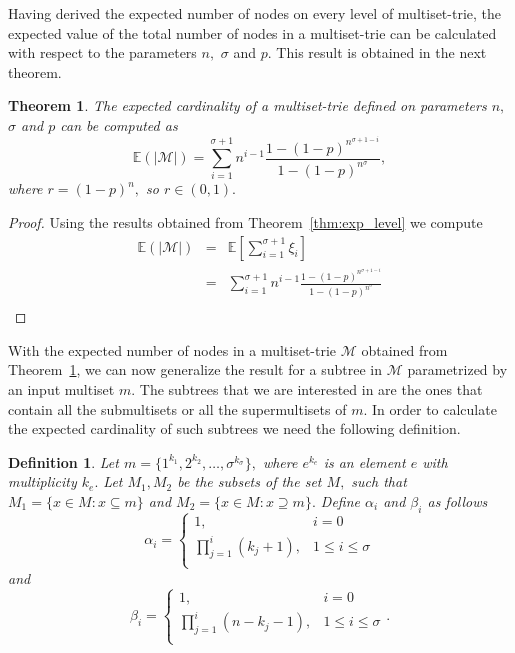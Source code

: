 \documentclass[10pt,letterpaper]{article}
\newtheorem{theorem}{Theorem}
\newtheorem{definition}{Definition}
\begin{document}
Having derived the expected number of nodes on every level of multiset-trie, the
expected value of the total number of nodes in a multiset-trie can be calculated 
with respect to the parameters $n,$ $\sigma$ and $p.$ This result is obtained in 
the next theorem.

\begin{theorem}\label{thm:exp_nodes}
The expected cardinality of a multiset-trie defined on parameters $n,$ $\sigma$ 
and $p$ can be computed as 
\begin{equation}
\mathbb{E}( | \mathcal{M} | ) = \sum_{i=1}^{\sigma+1} n^{i-1} \frac{1-(1-p)^{n^{\sigma +1 -i}}}{1-(1-p)^{n^{\sigma}}},
\end{equation}
where $r = (1-p)^n,$ so $r\in(0,1).$
\end{theorem}
\begin{proof}
Using the results obtained from Theorem~\ref{thm:exp_level} we compute 
\begin{eqnarray*}
\mathbb{E}( | \mathcal{M} | ) &=& \mathbb{E}\left[ \sum_{i=1}^{\sigma+1} \xi_i \right] \\
&=& \sum_{i=1}^{\sigma + 1} n^{i-1} \frac{1-(1-p)^{n^{\sigma + 1 -i}}}{1-(1-p)^{n^{\sigma}}} \\
\end{eqnarray*}

\end{proof}

With the expected number of nodes in a multiset-trie $\mathcal{M}$ obtained from 
Theorem~\ref{thm:exp_nodes}, we can now generalize the result for a subtree 
in $\mathcal{M}$ parametrized by an input multiset $m.$ The subtrees that we 
are interested in are the ones that contain all the submultisets or all the 
supermultisets of $m.$ In order to calculate the expected cardinality of such 
subtrees we need the following definition. 

\begin{definition}\label{def:params}
Let $m = \{ 1^{k_1}, 2^{k_2}, \ldots, \sigma^{k_\sigma} \},$ where 
$e^{k_e}$ is an element $e$ with multiplicity $k_e.$ Let $M_1, M_2$ be 
the subsets of the set $M,$ such that $M_1 = \{ x\in M : x\subseteq m \}$ and 
$M_2 = \{ x\in M : x\supseteq m \}.$
Define $\alpha_i$ and $\beta_i$ as follows 
\begin{equation*}
\alpha_i = \begin{cases}
1, & i=0 \\
\prod_{j=1}^i (k_j+1), & 1\leq i\leq\sigma \\
\end{cases}
\end{equation*} 
and 
\begin{equation*}
\beta_i = \begin{cases}
1, & i=0 \\
\prod_{j=1}^i (n-k_j-1), & 1\leq i\leq\sigma \\
\end{cases}.
\end{equation*}
\end{definition}
\end{document}
